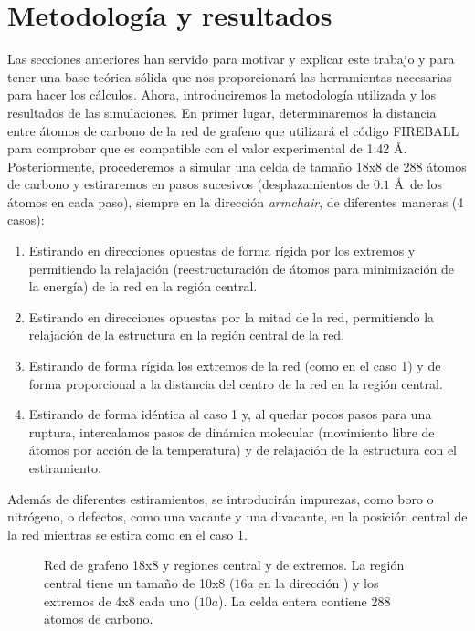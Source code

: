 \section{Metodología y resultados}
Las secciones anteriores han servido para motivar y explicar este trabajo y para tener una base teórica sólida que nos proporcionará las herramientas necesarias para hacer los cálculos. Ahora, introduciremos la metodología utilizada y los resultados de las simulaciones. En primer lugar, determinaremos la distancia entre átomos de carbono de la red de grafeno que utilizará el código FIREBALL para comprobar que es compatible con el valor experimental de 1.42 \AA. Posteriormente, procederemos a simular una celda de tamaño 18x8 de 288 átomos de carbono y estiraremos en pasos sucesivos (desplazamientos de $0.1$ \AA\ de los átomos en cada paso), siempre en la dirección \emph{armchair}, de diferentes maneras (4 casos):
\begin{enumerate}
    \item Estirando en direcciones opuestas de forma rígida por los extremos y permitiendo la relajación (reestructuración de átomos para minimización de la energía) de la red en la región central.
    \item Estirando en direcciones opuestas por la mitad de la red, permitiendo la relajación de la estructura en la región central de la red. 
    \item Estirando de forma rígida los extremos de la red (como en el caso 1) y de forma proporcional a la distancia del centro de la red en la región central.
    \item Estirando de forma idéntica al caso 1 y, al quedar pocos pasos para una ruptura, intercalamos pasos de dinámica molecular (movimiento libre de átomos por acción de la temperatura) y de relajación de la estructura con el estiramiento.
\end{enumerate}
Además de diferentes estiramientos, se introducirán impurezas, como boro o nitrógeno, o defectos, como una vacante y una divacante, en la posición central de la red mientras se estira como en el caso 1. 
\begin{figure}[htbp]
    \centering
    \def\svgwidth{.65\textwidth}
    
    \caption{Red de grafeno 18x8 y regiones central y de extremos. La región central tiene un tamaño de 10x8 ($16a$ en la dirección \arm) y los extremos de 4x8 cada uno ($10a$). La celda entera contiene 288 átomos de carbono.}
    \label{fig:enter-label}
\end{figure}

